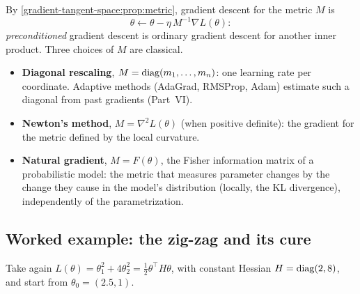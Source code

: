 \begin{notechapter}
By \cref{gradient-tangent-space:prop:metric}, gradient descent for the metric $M$ is
\[
  \theta\leftarrow\theta - \eta\,M^{-1}\nabla L(\theta):
\]
\emph{preconditioned} gradient descent is ordinary gradient descent for another inner product.
Three choices of $M$ are classical.
\begin{itemize}
  \item \textbf{Diagonal rescaling}, $M = \operatorname{diag}(m_1,\dots,m_n)$: one learning rate per coordinate. Adaptive
        methods (AdaGrad, RMSProp, Adam) estimate such a diagonal from past gradients
        (Part~VI).
  \item \textbf{Newton's method}, $M = \nabla^2L(\theta)$ (when positive definite): the gradient for the metric
        defined by the local curvature.
  \item \textbf{Natural gradient}, $M = F(\theta)$, the Fisher information matrix of a probabilistic model:
        the metric that measures parameter changes by the change they cause in the model's
        distribution (locally, the KL divergence), independently of the parametrization.
\end{itemize}

\subsection{Worked example: the zig-zag and its cure}\label{gradient-tangent-space:sec:zigzag}

Take again $L(\theta) = \theta_1^2 + 4\theta_2^2 = \frac12\theta^\top H\theta$, with constant Hessian $H = \operatorname{diag}(2, 8)$, and start from
$\theta_0 = (2.5, 1)$.


\end{notechapter}
